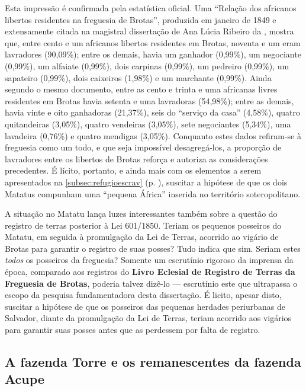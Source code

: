 Esta impressão é confirmada pela estatística oficial. Uma ``Relação dos africanos libertos residentes na freguesia de Brotas'', produzida em janeiro de 1849 e extensamente citada na magistral dissertação de Ana Lúcia Ribeiro da , mostra que, entre cento e um africanos libertos residentes em Brotas, noventa e um eram lavradores (90,09\%); entre os demais, havia um ganhador (0,99\%), um negociante (0,99\%), um alfaiate (0,99\%), dois carpinas (0,99\%), um pedreiro (0,99\%), um sapateiro (0,99\%), dois caixeiros (1,98\%) e um marchante (0,99\%). Ainda segundo o mesmo documento, entre as cento e trinta e uma africanas livres residentes em Brotas havia setenta e uma lavradoras (54,98\%); entre as demais, havia vinte e oito ganhadoras (21,37\%), seis do ``serviço da casa'' (4,58\%), quatro quitandeiras (3,05\%), quatro vendeiras (3,05\%), sete negociantes (5,34\%), uma lavadeira (0,76\%) e quatro mendigas (3,05\%). Conquanto estes dados refiram-se à freguesia como um todo, e que seja impossível desagregá-los, a proporção de lavradores entre os libertos de Brotas reforça e autoriza as considerações precedentes. É lícito, portanto, e ainda mais com os elementos a serem apresentados na \autoref{subsec:refugioescrav} (p. \pageref{subsec:refugioescrav}), suscitar a hipótese de que os dois Matatus compunham uma ``pequena África'' inserida no território soteropolitano.

A situação no Matatu lança luzes interessantes também sobre a questão do registro de terras posterior à Lei 601/1850. Teriam os pequenos posseiros do Matatu, em seguida à promulgação da Lei de Terras, acorrido ao vigário de Brotas para garantir o registro de suas posses? Tudo indica que sim. Seriam estes \textit{todos} os posseiros da freguesia? Somente um escrutínio rigoroso da imprensa da época, comparado aos registros do \textbf{Livro Eclesial de Registro de Terras da Freguesia de Brotas}, poderia talvez dizê-lo --- escrutínio este que ultrapassa o escopo da pesquisa fundamentadora desta dissertação. É licito, apesar disto, suscitar a hipótese de que os posseiros das pequenas herdades periurbanas de Salvador, diante da promulgação da Lei de Terras, teriam acorrido aos vigários para garantir suas posses antes que as perdessem por falta de registro.

\subsection{A fazenda Torre e os remanescentes da fazenda Acupe}

